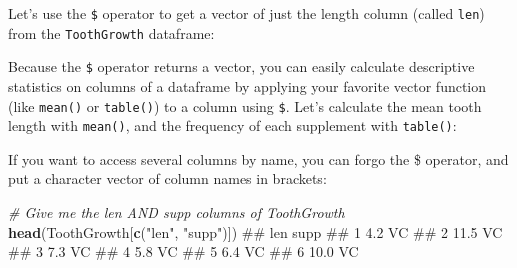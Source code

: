 \documentclass[]{book}
\newenvironment{Shaded}{\begin{snugshade}}{\end{snugshade}}
\newcommand{\KeywordTok}[1]{\textcolor[rgb]{0.13,0.29,0.53}{\textbf{{#1}}}}
\newcommand{\StringTok}[1]{\textcolor[rgb]{0.31,0.60,0.02}{{#1}}}
\newcommand{\CommentTok}[1]{\textcolor[rgb]{0.56,0.35,0.01}{\textit{{#1}}}}
\newcommand{\NormalTok}[1]{{#1}}
\theoremstyle{definition}
\theoremstyle{definition}
\theoremstyle{remark}
\begin{document}
Let's use the \texttt{\$} operator to get a vector of just the length
column (called \texttt{len}) from the \texttt{ToothGrowth} dataframe:

\begin{Shaded}
\end{Shaded}

Because the \texttt{\$} operator returns a vector, you can easily
calculate descriptive statistics on columns of a dataframe by applying
your favorite vector function (like \texttt{mean()} or \texttt{table()})
to a column using \texttt{\$}. Let's calculate the mean tooth length
with \texttt{mean()}, and the frequency of each supplement with
\texttt{table()}:

\begin{Shaded}
\end{Shaded}

If you want to access several columns by name, you can forgo the \$
operator, and put a character vector of column names in brackets:

\begin{Shaded}
\begin{Highlighting}[]
\CommentTok{# Give me the len AND supp columns of ToothGrowth}
\KeywordTok{head}\NormalTok{(ToothGrowth[}\KeywordTok{c}\NormalTok{(}\StringTok{"len"}\NormalTok{, }\StringTok{"supp"}\NormalTok{)])}
\NormalTok{##    len supp}
\NormalTok{## 1  4.2   VC}
\NormalTok{## 2 11.5   VC}
\NormalTok{## 3  7.3   VC}
\NormalTok{## 4  5.8   VC}
\NormalTok{## 5  6.4   VC}
\NormalTok{## 6 10.0   VC}
\end{Highlighting}
\end{Shaded}
\end{document}
